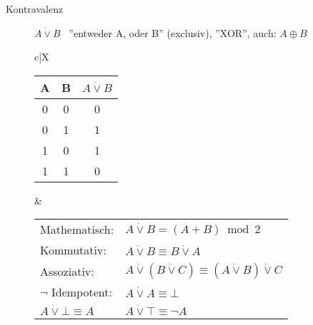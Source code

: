 \documentclass[12pt,a4paper]{article}
\begin{document}
\begin{description}
\begin{description}
			\item[Kontravalenz] $A\dot{\vee}B$ \, ''entweder A, oder B'' (exclusiv), ''XOR'', auch: $A\oplus B$ \\
				\begin{tabularx}{\linewidth}{c|X}
					\begin{tabular}[t]{c|c||c}
						A & B & $A \dot{\vee} B$ \\ \hline\hline
						0 & 0 & 0                \\ \hline
						0 & 1 & 1                \\ \hline
						1 & 0 & 1                \\ \hline
						1 & 1 & 0
					\end{tabular} &
					\begin{tabular}[t]{ll}
						Mathematisch:                & $A \dot{\vee} B = (A + B)\bmod 2$                                    \\
						Kommutativ:                  & $A \dot{\vee} B \equiv B \dot{\vee} A$                               \\
						Assoziativ:                  & $A \dot{\vee} (B \dot{\vee} C) \equiv (A \dot{\vee} B) \dot{\vee} C$ \\
						$\neg$ Idempotent:           & $A \dot{\vee} A \equiv \bot$                                         \\
						$A \dot{\vee} \bot \equiv A$ & $A \dot{\vee} \top \equiv \neg A$
					\end{tabular} \\ \hline
				\end{tabularx}


\end{description}
\end{description}
\end{document}
